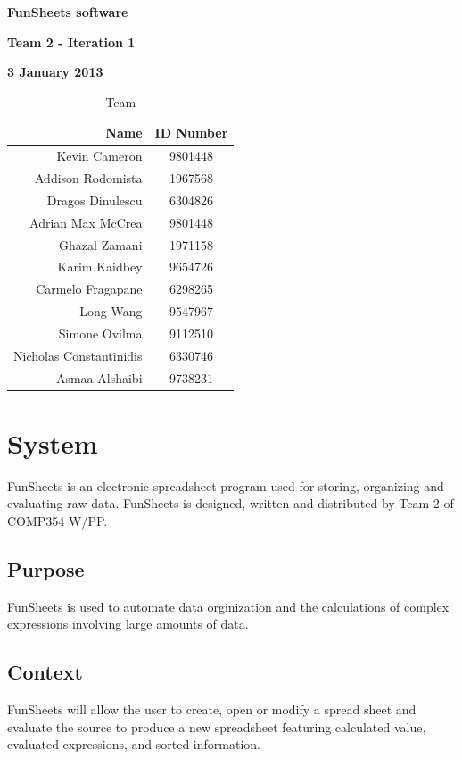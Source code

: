 \documentclass[12pt]{article}
\begin{document}
\vspace*{0.5in}
\centerline{\bf\Large FunSheets software}

\vspace*{0.5in}
\centerline{\bf\Large Team 2 - Iteration 1}

\vspace*{0.5in}
\centerline{\bf\Large 3 January 2013}

\vspace*{1.5in}
\begin{table}[htbp]
\caption{Team}
\begin{center}
\begin{tabular}{|r | c|}
\hline
Name & ID Number \\\hline\hline
Kevin Cameron & 9801448 \\\hline\hline
Addison Rodomista & 1967568 \\\hline\hline
Dragos Dinulescu & 6304826 \\\hline\hline
Adrian Max McCrea & 9801448 \\\hline\hline
Ghazal Zamani & 1971158 \\\hline\hline
Karim Kaidbey & 9654726 \\\hline\hline
Carmelo Fragapane & 6298265 \\\hline\hline
Long Wang & 9547967 \\\hline\hline
Simone Ovilma & 9112510 \\\hline\hline
Nicholas Constantinidis & 6330746 \\\hline\hline
Asmaa Alshaibi & 9738231 \\\hline
\end{tabular}
\end{center}
\end{table}

\clearpage

\section{System}
FunSheets is an electronic spreadsheet program used for storing, organizing and evaluating raw data. FunSheets is designed, written and distributed by Team 2 of COMP354 W/PP.

\subsection{Purpose}
FunSheets is used to automate data orginization and the calculations of complex expressions involving large amounts of data.
\subsection{Context}
FunSheets will allow the user to create, open or modify a spread sheet and evaluate the source to produce a new spreadsheet featuring calculated value, evaluated expressions, and sorted information.
\end{document}
